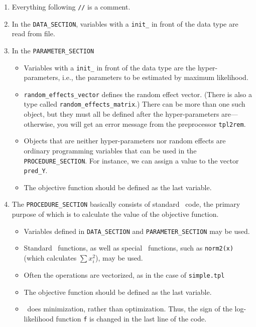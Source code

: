 \documentclass{admbmanual}
\begin{document}
\begin{enumerate}
\item Everything following \texttt{//} is a comment.

\item In the \texttt{DATA\_SECTION}, variables with a \texttt{init\_} in
front of the data type are read from file.

\item In the \texttt{PARAMETER\_SECTION}
\begin{itemize}
\item Variables with a \texttt{init\_}
	in front of the data type are the hyper-parameters, i.e., the parameters to
	be estimated by maximum likelihood.
\item \texttt{random\_effects\_vector} defines the random effect vector. (There
    is also a type called \texttt{random\_effects\_matrix}.) There can be more than one
    such object, but they must all be defined after the hyper-parameters are---otherwise,
    you will get an error message from the preprocessor \texttt{tpl2rem}.
\item Objects that are neither hyper-parameters nor random effects are ordinary programming variables 
	that can be used in the \texttt{PROCEDURE\_SECTION}. For instance, we can assign a value to the
	vector \texttt{pred\_Y}.
\item The objective function should be defined as the last variable.
\end{itemize}

\item The \texttt{PROCEDURE\_SECTION} basically consists of standard \cplus\ code, the primary purpose 
	of which is to calculate the value of the objective function. 
\begin{itemize}
\item Variables defined in \texttt{DATA\_SECTION} and \texttt{PARAMETER\_SECTION} may be used.
\item Standard \cplus\ functions, as well as special \scAB\ functions, such as \texttt{norm2(x)} 
	(which calculates $\sum x_i^2$), may be used.
\item Often the operations are vectorized, as in the case of \texttt{simple.tpl}
\item The objective function should be defined as the last variable.
\item \scAB\ does minimization, rather than optimization. Thus, the sign of
the log-likelihood function \texttt{f} is changed in the last line of the
code.
\end{itemize}
\end{enumerate}
\end{document}
